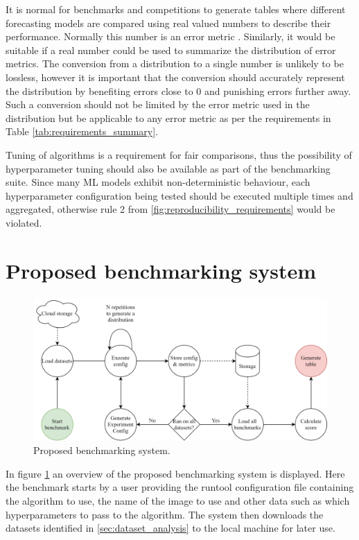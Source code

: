It is normal for benchmarks and competitions to generate tables where different forecasting models are compared using real valued numbers to describe their performance. Normally this number is an error metric \cite{m3_competition,makridakis_m4_2020,m5,hyndman_forecasting_3rd,salinas_deepar_2019,oreshkin_n_beats_2020}. Similarly, it would be suitable if a real number could be used to summarize the distribution of error metrics. The conversion from a distribution to a single number is unlikely to be lossless, however it is important that the conversion should accurately represent the distribution by benefiting errors close to 0 and punishing errors further away. Such a conversion should not be limited by the error metric used in the distribution but be applicable to any error metric as per the requirements in Table \ref{tab:requirements_summary}.

Tuning of algorithms is a requirement for fair comparisons, thus the possibility of hyperparameter tuning should also be available as part of the benchmarking suite. Since many ML models exhibit non-deterministic behaviour, each hyperparameter configuration being tested should be executed multiple times and aggregated, otherwise rule 2 from \ref{fig:reproducibility_requirements} would be violated.

\section{Proposed benchmarking system}

\begin{figure}[h]
  \centering
  \includegraphics[width=\linewidth]{./img/benchmarking_system_architecture.png}
  \caption{Proposed benchmarking system.}
  \label{fig:proposed_benchmarking_system}
\end{figure}

In figure \ref{fig:proposed_benchmarking_system} an overview of the proposed benchmarking system is displayed. Here the benchmark starts by a user providing the runtool configuration file containing the algorithm to use, the name of the image to use and other data such as which hyperparameters to pass to the algorithm. The system then downloads the datasets identified in \ref{sec:dataset_analysis} to the local machine for later use.

